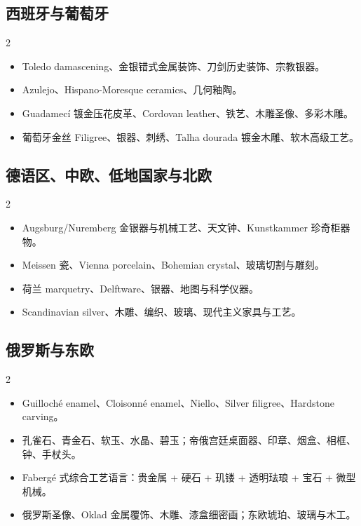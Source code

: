 \documentclass[lang=en,a4paper,11pt]{elegantpaper}
\begin{document}
\subsection{西班牙与葡萄牙}


\begin{multicols}{2}
\begin{itemize}
\item Toledo damascening、金银错式金属装饰、刀剑历史装饰、宗教银器。
\item Azulejo、Hispano-Moresque ceramics、几何釉陶。
\item Guadamecí 镀金压花皮革、Cordovan leather、铁艺、木雕圣像、多彩木雕。
\item 葡萄牙金丝 Filigree、银器、刺绣、Talha dourada 镀金木雕、软木高级工艺。
\end{itemize}
\end{multicols}

\subsection{德语区、中欧、低地国家与北欧}


\begin{multicols}{2}
\begin{itemize}
\item Augsburg/Nuremberg 金银器与机械工艺、天文钟、Kunstkammer 珍奇柜器物。
\item Meissen 瓷、Vienna porcelain、Bohemian crystal、玻璃切割与雕刻。
\item 荷兰 marquetry、Delftware、银器、地图与科学仪器。
\item Scandinavian silver、木雕、编织、玻璃、现代主义家具与工艺。
\end{itemize}
\end{multicols}

\subsection{俄罗斯与东欧}


\begin{multicols}{2}
\begin{itemize}
\item Guilloché enamel、Cloisonné enamel、Niello、Silver filigree、Hardstone carving。
\item 孔雀石、青金石、软玉、水晶、碧玉；帝俄宫廷桌面器、印章、烟盒、相框、钟、手杖头。
\item Fabergé 式综合工艺语言：贵金属 + 硬石 + 玑镂 + 透明珐琅 + 宝石 + 微型机械。
\item 俄罗斯圣像、Oklad 金属覆饰、木雕、漆盒细密画；东欧琥珀、玻璃与木工。
\end{itemize}
\end{multicols}
\end{document}
